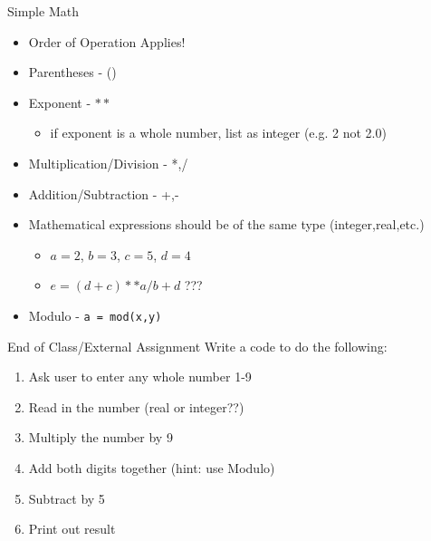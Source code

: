 \documentclass{beamer}
\begin{document}
\begin{frame}{Simple Math}
\begin{itemize}
  \item Order of Operation Applies!
  \vfill\item Parentheses - ()
  \item Exponent - $**$
   \vfill \begin{itemize}
      \item if exponent is a whole number, list as integer (e.g. 2 not 2.0)
    \end{itemize}
  \vfill\item Multiplication/Division - *,/
  \vfill\item Addition/Subtraction - +,-
  \vfill\item Mathematical expressions should be of the same type (integer,real,etc.)
    \begin{itemize}
      \item $a=2$, $b=3$, $c=5$, $d=4$
      \item $e = (d + c)**a/b + d$ ???
    \end{itemize}
  \vfill\item Modulo - \texttt{a = mod(x,y)}
\end{itemize}
\end{frame}
\begin{frame}{End of Class/External Assignment}
Write a code to do the following:
\begin{enumerate}
  \item Ask user to enter any whole number 1-9
  \vfill\item Read in the number (real or integer??)
  \vfill\item Multiply the number by 9
  \vfill\item Add both digits together (hint: use Modulo)
  \vfill\item Subtract by 5
  \vfill\item Print out result \\ \vfill
{}
\end{enumerate}
\end{frame}
\end{document}
